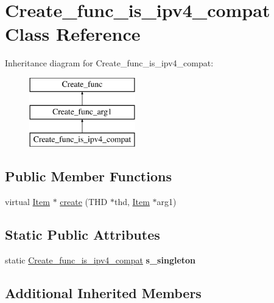 \hypertarget{classCreate__func__is__ipv4__compat}{}\section{Create\+\_\+func\+\_\+is\+\_\+ipv4\+\_\+compat Class Reference}
\label{classCreate__func__is__ipv4__compat}
Inheritance diagram for Create\+\_\+func\+\_\+is\+\_\+ipv4\+\_\+compat\+:\begin{figure}[H]
\begin{center}
\leavevmode
\includegraphics[height=3.000000cm]{classCreate__func__is__ipv4__compat}
\end{center}
\end{figure}
\subsection*{Public Member Functions}
\begin{DoxyCompactItemize}
\item 
virtual \mbox{\hyperlink{classItem}{Item}} $\ast$ \mbox{\hyperlink{classCreate__func__is__ipv4__compat_aad63c6660a84517a2cbe73206628f9e1}{create}} (T\+HD $\ast$thd, \mbox{\hyperlink{classItem}{Item}} $\ast$arg1)
\end{DoxyCompactItemize}
\subsection*{Static Public Attributes}
\begin{DoxyCompactItemize}
\item 
\mbox{\label{classCreate__func__is__ipv4__compat_a1fd979ff2b747027e3734e2172178e89}} 
static \mbox{\hyperlink{classCreate__func__is__ipv4__compat}{Create\+\_\+func\+\_\+is\+\_\+ipv4\+\_\+compat}} {\bfseries s\+\_\+singleton}
\end{DoxyCompactItemize}
\subsection*{Additional Inherited Members}


